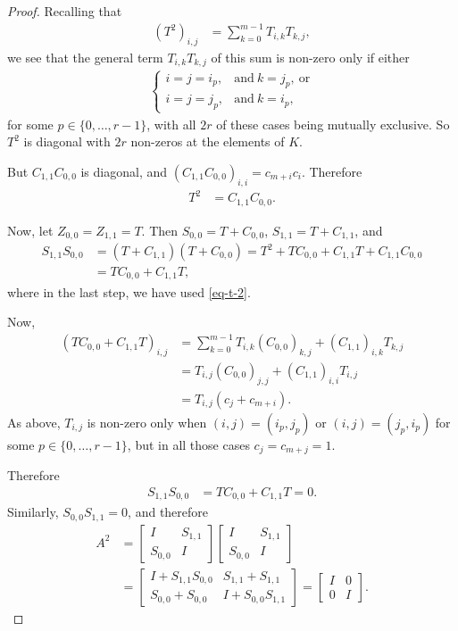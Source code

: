 \documentclass[12pt,a4paper]{article}
\begin{document}
\begin{proof}
Recalling that
\begin{align*}
(T^2)_{i,j}
&=
\sum_{k=0}^{m-1} T_{i,k} T_{k,j},
\end{align*}
we see that the general term $T_{i,k} T_{k,j}$ of this sum is non-zero only if either
\begin{align*}
\begin{cases}
i = j = i_p,&\text{and}\ k=j_p,\ \text{or}
\\
i = j = j_p,&\text{and}\ k=i_p,
\end{cases}
\end{align*}
for some $p \in \{0,\ldots,r-1\}$, with all $2r$ of these cases being mutually exclusive.
So $T^2$ is diagonal with $2r$ non-zeros at the elements of $K$.

But $C_{1,1} C_{0,0}$ is diagonal, and $(C_{1,1} C_{0,0})_{i,i} = c_{m+i} c_i$.
Therefore
\begin{align}
T^2 &= C_{1,1} C_{0,0}.
\label{eq-t-2}
\end{align}

Now, let $Z_{0,0}=Z_{1,1}=T$. Then $S_{0,0} = T + C_{0,0}$, $S_{1,1} = T + C_{1,1}$, and
\begin{align*}
S_{1,1} S_{0,0}
&=
(T + C_{1,1})(T + C_{0,0})
=
T^2 + T C_{0,0} + C_{1,1} T + C_{1,1} C_{0,0}
\\
&=
T C_{0,0} + C_{1,1} T,
\end{align*}
where in the last step, we have used \eqref{eq-t-2}.

Now,
\begin{align*}
(T C_{0,0} + C_{1,1} T)_{i,j}
&=
\sum_{k=0}^{m-1} T_{i,k} (C_{0,0})_{k,j} + (C_{1,1})_{i,k} T_{k,j}
\\
&=
T_{i,j} (C_{0,0})_{j,j} + (C_{1,1})_{i,i} T_{i,j}
\\
&=
T_{i,j} \left( c_j + c_{m+i} \right).
\end{align*}
As above, $T_{i,j}$ is non-zero only when $(i,j)=(i_p,j_p)$ or $(i,j)=(j_p,i_p)$
for some $p \in \{0,\ldots,r-1\}$, but in all those cases $c_j=c_{m+j}=1$.

Therefore
\begin{align*}
S_{1,1} S_{0,0} &= T C_{0,0} + C_{1,1} T = 0.
\end{align*}
Similarly, $S_{0,0} S_{1,1} = 0$, and therefore
\begin{align*}
A^2
&=
\left[
\begin{array}{cc}
I & S_{1,1}
\\
S_{0,0} & I
\end{array}
\right]
\left[
\begin{array}{cc}
I & S_{1,1}
\\
S_{0,0} & I
\end{array}
\right]
\\
&=
\left[
\begin{array}{cc}
I + S_{1,1} S_{0,0} & S_{1,1} + S_{1,1}
\\
S_{0,0} + S_{0,0} & I + S_{0,0} S_{1,1}
\end{array}
\right]
=
\left[
\begin{array}{cc}
I & 0
\\
0 & I
\end{array}
\right].
\end{align*}


\end{proof}
\end{document}
